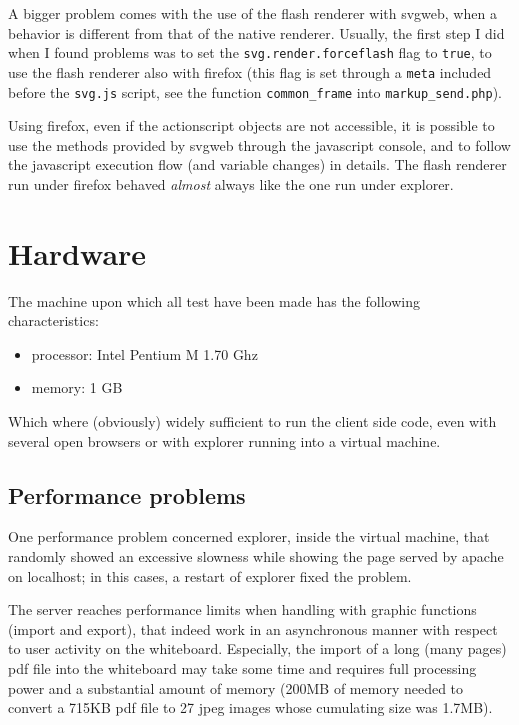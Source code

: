 \documentclass[10pt,a4paper,english]{book}
\begin{document}
A bigger problem comes with the use of the flash renderer with svgweb,
when a behavior is different from that of the native
renderer. Usually, the first step I did when I found problems was to
set the \texttt{svg.render.forceflash} flag to \texttt{true}, to use the flash
renderer also with firefox (this flag is set through a \texttt{meta}
included before the \texttt{svg.js} script, see the function
\texttt{common{\_}frame} into \texttt{markup{\_}send.php}).

Using firefox, even if the actionscript objects are not accessible, it
is possible to use the methods provided by svgweb through the
javascript console, and to follow the javascript execution flow (and
variable changes) in details. The flash renderer run under firefox
behaved \emph{almost} always like the one run under explorer.



\hypertarget{hardware}{}
\section{Hardware}
\label{hardware}

The machine upon which all test have been made has the following
characteristics:
\begin{itemize}
\item {} 
processor: Intel Pentium M 1.70 Ghz

\item {} 
memory: 1 GB

\end{itemize}

Which where (obviously) widely sufficient to run the client side code,
even with several open browsers or with explorer running into a
virtual machine.



\hypertarget{performance-problems}{}
\subsection{Performance problems}
\label{performance-problems}

One performance problem concerned explorer, inside the virtual
machine, that randomly showed an excessive slowness while showing the
page served by apache on localhost; in this cases, a restart of
explorer fixed the problem.

The server reaches performance limits when handling with graphic
functions (import and export), that indeed work in an asynchronous
manner with respect to user activity on the whiteboard. Especially,
the import of a long (many pages) pdf file into the whiteboard may
take some time and requires full processing power and a substantial
amount of memory (200MB of memory needed to convert a 715KB pdf file
to 27 jpeg images whose cumulating size was 1.7MB).
\end{document}
